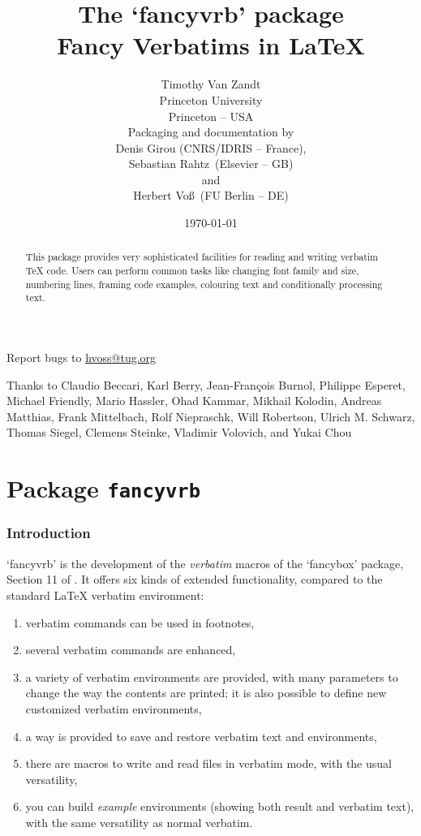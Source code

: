 \documentclass[twoside]{article}
\title{The `\textsf{fancyvrb}' package\\Fancy Verbatims in \LaTeX}
\author{Timothy Van Zandt\\Princeton University\\Princeton -- USA\\[5mm]
        {Packaging and documentation by}\\
        {\footnotesize Denis Girou (CNRS/IDRIS -- France),}\\[-2mm]
        {\footnotesize Sebastian Rahtz\dagger\ (Elsevier -- GB)}\\[-2mm]
        {\footnotesize and}\\[-2mm]
        {\footnotesize Herbert Voß\ (FU Berlin -- DE)}
        }
\date{\today}
\newcommand\FBoxPackage{`\textsf{fancybox}'}
\newcommand\FVrbPackage{`\textsf{fancyvrb}'}
\begin{document}
\maketitle
%
\begin{abstract}
    This package provides very sophisticated facilities for reading and
  writing verbatim \TeX{} code. Users can perform common tasks like changing
  font family and size, numbering lines, framing code examples, colouring
  text and conditionally processing text.
\end{abstract}

\begin{center}
Report bugs to \url{hvoss@tug.org}
\end{center}

\vfill
Thanks to 
Claudio Beccari,
Karl Berry,
Jean-François Burnol, 
Philippe Esperet, %
Michael Friendly, %
Mario Hassler, %
Ohad Kammar, %
Mikhail Kolodin, %
Andreas Matthias,
Frank Mittelbach,
Rolf Niepraschk, %
Will Robertson,
Ulrich M. Schwarz, 
Thomas Siegel, %
Clemens Steinke,
Vladimir Volovich,
and 
Yukai Chou 
\clearpage
\tableofcontents
\clearpage


\part{Package \texttt{fancyvrb}}


\section{Introduction}
%
\FVrbPackage{} is the development of the \emph{verbatim} macros of the
\FBoxPackage{} package,  Section 11 of \cite{ctan-fancybox}. It offers six kinds
of extended functionality, compared to the standard \LaTeX{}
\textsf{verbatim} environment:

\begin{enumerate}
  \item verbatim commands can be used in footnotes,
  \item several verbatim commands are enhanced,
  \item a variety of verbatim environments are provided, with many
  parameters to change the way the contents are printed; it is also possible
  to define new customized verbatim environments,
  \item a way is provided to save and restore verbatim text and environments,
  \item there are macros to write and read files in verbatim mode, with the
  usual versatility,
  \item you can build \emph{example} environments (showing both result and
  verbatim text), with the same versatility as normal verbatim.
\end{enumerate}
\end{document}
